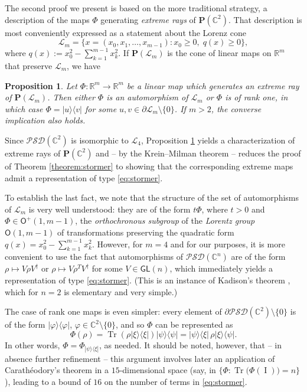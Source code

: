 \documentclass[10pt]{article}
\newcommand{\vphi}{\varphi}
\DeclareMathOperator{\tr}{Tr}
\DeclareMathOperator{\Id}{I}
\renewcommand{\geq}{\geqslant}
\newcommand{\cD}{\mathrm{D}}
\newcommand{\mL}{\mathcal{L}}
\newcommand{\PSD}{\mathcal{PSD}}
\newcommand{\LP}{\cP(\mathcal{L}_m)}
\newcommand{\cP}{\bm{P}}
\newcommand{\R}{\mathbb{R}}
\newcommand{\C}{\mathbb{C}}
\newcommand{\Rp}{\mathbb{R}_+}
\newcommand{\gO}{\mathsf{O}}
\newcommand{\gGL}{\mathsf{GL}}
\newcommand{\ketbra}[2]{| #1 \rangle \langle #2 |}
\newcommand{\bra}[1]{\langle #1 |}
\newcommand{\ket}[1]{| #1 \rangle}
\theoremstyle{plain}
\newtheorem{proposition}[theorem]{Proposition}
\theoremstyle{definition}
\theoremstyle{remark}
\begin{document}
The second proof we present is based on the more traditional strategy, a description of the maps 
$\Phi$  generating {\em extreme rays} of $\cP(\C^2)$. 
That description is most conveniently expressed as a statement about the Lorenz cone 
$$
\mL_m = \big\{x=(x_0,x_1,\ldots,x_{m-1}) : x_0\geq 0, \; q(x) \geq 0 \big\}, 
$$ 
where $q(x) :=  x_0^2 - \sum_{k=1}^{m-1} x_k^2$. If  $\LP$ %
is the cone of linear maps on $\R^m$ that preserve $\mL_m$, we have \cite{LoewySchneider75}

\begin{proposition} \label{prop:loewy-schneider}
Let $\Phi : \R^m  \to \R^m $ be a %
linear map which generates an extreme ray of $\LP$. 
Then either $\Phi$ is an automorphism of $\mL_m $ or $\Phi$ is of rank one, in which case  
$\Phi = \ketbra{u}{v}$  for some $u, v \in \partial \mL_m  \setminus\{0\}$. 
If $m>2$, the converse implication also holds. 
\end{proposition} 


Since $\PSD(\C^2)$   %
is isomorphic to $\mL_4$, Proposition \ref{prop:loewy-schneider} yields a characterization of 
extreme rays of $\cP(\C^2)$ and -- by the Krein--Milman theorem -- reduces  the proof of 
Theorem \ref{theorem:stormer} to showing that the corresponding extreme maps admit a 
representation of type \eqref{eq:stormer}. 


To establish the last fact, we note that the structure of the set of automorphisms of $\mathcal{L}_m$ 
is very well understood: they are of the form $t \Phi$, where $t>0$ and  $\Phi \in \gO^+(1,m-1)$, 
the {\em orthochronous subgroup} of the {\em Lorentz group} $\gO(1,m-1)$ 
of transformations preserving the 
quadratic form $q(x)= x_0^2-\sum_{k=1}^{m-1} x_k^2$.  However, for $m=4$ and for our purposes,  
it is more convenient to use the fact that automorphisms of $\PSD(\C^n)$ are of the form 
$\rho \mapsto V\rho V^\dagger$ or $\rho \mapsto V\rho^TV^\dagger$ for some $V\in \gGL(n)$, 
which immediately yields a representation of type \eqref{eq:stormer}. 
(This is an instance of Kadison's theorem \cite{Kadison65}, 
which  for $n=2$ is elementary and very simple.)

The case of rank one maps is even simpler:  
every element of $\partial \PSD(\C^2)\setminus\{0\}$ is of the 
form $\ketbra{\vphi}{\vphi}$, $\vphi \in \C^2\setminus\{0\}$, and so   $\Phi$  can be represented as
\[
\Phi(\rho) =   \tr(\rho \ketbra{\xi}{\xi}) \ketbra{\psi}{\psi} = \ket \psi \bra\xi \, \rho \ket \xi \bra \psi .  
\]
In other words, $\Phi = \Phi_{ \ketbra{\psi}{\xi}}$, as needed. 
It should be noted, however, that -- in absence further refinement -- 
this argument involves later an application 
of Carath\'eodory's theorem in a $15$-dimensional space (say, in $\{\Phi :  \tr \big(\Phi(\Id)\big) =n \}$), 
leading to a bound of $16$ on the number of terms in \eqref{eq:stormer}. 
\end{document}
